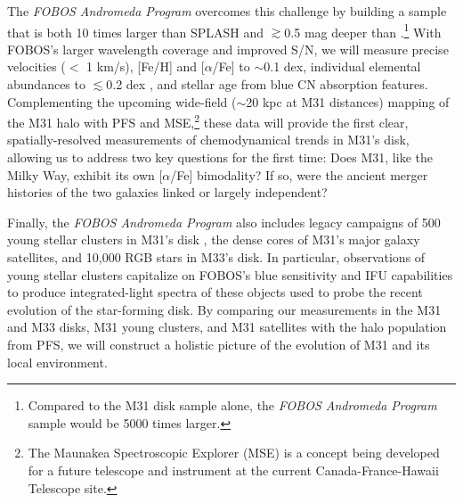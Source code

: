 \documentclass[11pt,a4paper,twoside,onecolumn,openany,final,oldfontcommands]{memoir}
\begin{document}
The \textit{FOBOS Andromeda Program} overcomes this challenge by building a sample that is both 10 times larger than SPLASH and $\gtrsim$0.5 mag deeper than \citet{Escala20}.\footnote{Compared to the \citet{Escala20} M31 disk sample alone, the \textit{FOBOS Andromeda Program} sample would be 5000 times larger.}  With FOBOS's larger wavelength coverage and improved S/N, we will measure precise velocities ($<$ 1 km/s), [Fe/H] and [$\alpha$/Fe] to $\sim$0.1 dex, individual elemental abundances to $\lesssim$0.2 dex \citep[Fig.~\ref{fig:abundances_snr}; cf.][]{YST2017}, and stellar age from blue CN absorption features.  Complementing the upcoming wide-field ($\sim$20 kpc at M31 distances) mapping of the M31 halo with PFS and MSE,\footnote{The Maunakea Spectroscopic Explorer (MSE) is a concept being developed for a future telescope and instrument at the current Canada-France-Hawaii Telescope site.} these data will provide the first clear, spatially-resolved measurements of chemodynamical trends in M31's disk, allowing us to address two key questions for the first time: Does M31, like the Milky Way, exhibit its own [$\alpha$/Fe] bimodality?  If so, were the ancient merger histories of the two galaxies linked or largely independent?

Finally, the \textit{FOBOS Andromeda Program} also includes legacy campaigns of 500 young stellar clusters in M31's disk \citep[dwarfing even Milky Way samples,][]{johnson15}, the dense cores of M31's major galaxy satellites, and 10,000 RGB stars in M33's disk.  In particular, observations of young stellar clusters capitalize on FOBOS's blue sensitivity and IFU capabilities to produce integrated-light spectra of these objects used to probe the recent evolution of the star-forming disk.  By comparing our measurements in the M31 and M33 disks, M31 young clusters, and M31 satellites with the halo population from PFS, we will construct a holistic picture of the evolution of M31 and its local environment.



\end{document}

